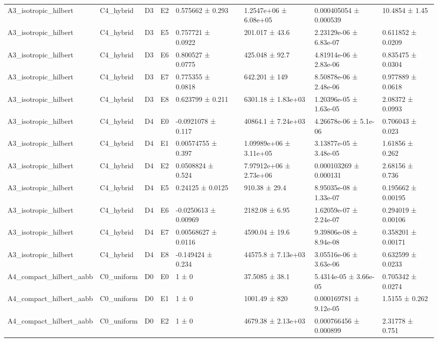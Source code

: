\begin{table}
\begin{tabular}{lllllllll}
A3\_isotropic\_hilbert & C4\_hybrid & D3 & E2 & 0.575662 ± 0.293 &  & 1.2547e+06 ± 6.08e+05 & 0.000405054 ± 0.000539 & 10.4854 ± 1.45 \\
A3\_isotropic\_hilbert & C4\_hybrid & D3 & E5 & 0.757721 ± 0.0922 &  & 201.017 ± 43.6 & 2.23129e-06 ± 6.83e-07 & 0.611852 ± 0.0209 \\
A3\_isotropic\_hilbert & C4\_hybrid & D3 & E6 & 0.800527 ± 0.0775 &  & 425.048 ± 92.7 & 4.81914e-06 ± 2.83e-06 & 0.835475 ± 0.0304 \\
A3\_isotropic\_hilbert & C4\_hybrid & D3 & E7 & 0.775355 ± 0.0818 &  & 642.201 ± 149 & 8.50878e-06 ± 2.48e-06 & 0.977889 ± 0.0618 \\
A3\_isotropic\_hilbert & C4\_hybrid & D3 & E8 & 0.623799 ± 0.211 &  & 6301.18 ± 1.83e+03 & 1.20396e-05 ± 1.63e-05 & 2.08372 ± 0.0993 \\
A3\_isotropic\_hilbert & C4\_hybrid & D4 & E0 & -0.0921078 ± 0.117 &  & 40864.1 ± 7.24e+03 & 4.26678e-06 ± 5.1e-06 & 0.706043 ± 0.023 \\
A3\_isotropic\_hilbert & C4\_hybrid & D4 & E1 & 0.00574755 ± 0.397 &  & 1.09989e+06 ± 3.11e+05 & 3.13877e-05 ± 3.48e-05 & 1.61856 ± 0.262 \\
A3\_isotropic\_hilbert & C4\_hybrid & D4 & E2 & 0.0508824 ± 0.524 &  & 7.97912e+06 ± 2.73e+06 & 0.000103269 ± 0.000131 & 2.68156 ± 0.736 \\
A3\_isotropic\_hilbert & C4\_hybrid & D4 & E5 & 0.24125 ± 0.0125 &  & 910.38 ± 29.4 & 8.95035e-08 ± 1.33e-07 & 0.195662 ± 0.00195 \\
A3\_isotropic\_hilbert & C4\_hybrid & D4 & E6 & -0.0250613 ± 0.00969 &  & 2182.08 ± 6.95 & 1.62059e-07 ± 2.24e-07 & 0.294019 ± 0.00106 \\
A3\_isotropic\_hilbert & C4\_hybrid & D4 & E7 & 0.00568627 ± 0.0116 &  & 4590.04 ± 19.6 & 9.39806e-08 ± 8.94e-08 & 0.358201 ± 0.00171 \\
A3\_isotropic\_hilbert & C4\_hybrid & D4 & E8 & -0.149424 ± 0.234 &  & 44575.8 ± 7.13e+03 & 3.05516e-06 ± 3.63e-06 & 0.632599 ± 0.0233 \\
A4\_compact\_hilbert\_aabb & C0\_uniform & D0 & E0 & 1 ± 0 &  & 37.5085 ± 38.1 & 5.4314e-05 ± 3.66e-05 & 0.705342 ± 0.0274 \\
A4\_compact\_hilbert\_aabb & C0\_uniform & D0 & E1 & 1 ± 0 &  & 1001.49 ± 820 & 0.000169781 ± 9.12e-05 & 1.5155 ± 0.262 \\
A4\_compact\_hilbert\_aabb & C0\_uniform & D0 & E2 & 1 ± 0 &  & 4679.38 ± 2.13e+03 & 0.000766456 ± 0.000899 & 2.31778 ± 0.751 \\

\end{tabular}
\end{table}
